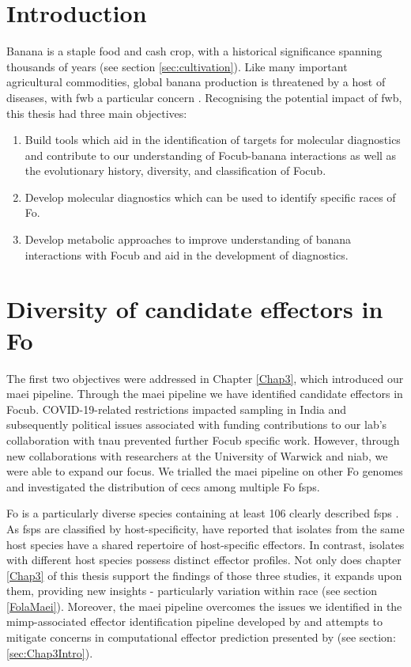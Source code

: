 
\section{Introduction}

Banana is a staple food and cash crop, with a historical significance spanning thousands of years (see section \ref{sec:cultivation}). Like many important agricultural commodities, global banana production is threatened by a host of diseases, with \Acf{fwb} a particular concern \parencite{Ploetz2005}. Recognising the potential impact of \ac{fwb}, this thesis had three main objectives:

\begin{enumerate}
    \item Build tools which aid in the identification of targets for molecular diagnostics and contribute to our understanding of \ac{Focub}-banana interactions as well as the evolutionary history, diversity, and classification of \ac{Focub}. 
    \item Develop molecular diagnostics which can be used to identify specific races of \acl{Fo}. 
    \item Develop metabolic approaches to improve understanding of banana interactions with \ac{Focub} and aid in the development of diagnostics.
\end{enumerate}

\section{Diversity of candidate effectors in \acl{Fo}}

The first two objectives were addressed in Chapter \ref{Chap3}, which introduced our \acf{maei} pipeline. Through the \ac{maei} pipeline we have identified candidate effectors in \ac{Focub}. COVID-19-related restrictions impacted sampling in India and subsequently political issues associated with funding contributions to our lab's collaboration with \acf{tnau} prevented further \ac{Focub} specific work. However, through new collaborations with researchers at the University of Warwick and \ac{niab}, we were able to expand our focus. We trialled the \ac{maei} pipeline on other \ac{Fo} genomes and investigated the distribution of \acfp{cec} among multiple \acf{Fo} \acfp{fsp}.  

\ac{Fo} is a particularly diverse species containing at least 106 clearly described \acp{fsp} \parencite{Edel-Hermann2019}. As \acp{fsp} are classified by host-specificity, \textcite{Dam2016,Dam2017,FoEC2} have reported that isolates from the same host species have a shared repertoire of host-specific effectors. In contrast, isolates with different host species possess distinct effector profiles. Not only does chapter \ref{Chap3} of this thesis support the findings of those three studies, it expands upon them, providing new insights - particularly variation within race (see section \ref{FolaMaei}). Moreover, the \ac{maei} pipeline overcomes the issues we identified in the \ac{mimp}-associated effector identification pipeline developed by \textcite{Dam2016} and attempts to mitigate concerns in computational effector prediction presented by \textcite{Sperschneider2015, LoPresti2015, Todd2022} (see section: \ref{sec:Chap3Intro}). 

